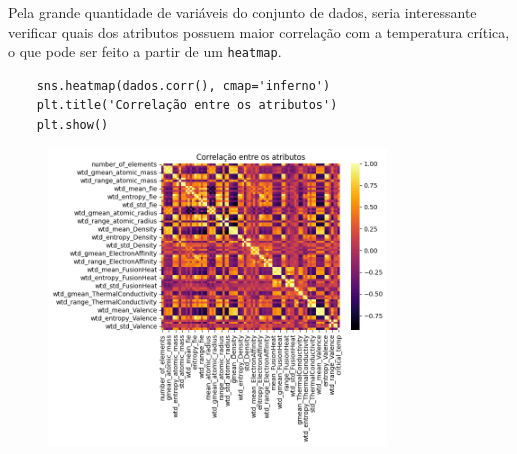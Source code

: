 Pela grande quantidade de variáveis do conjunto de dados, seria interessante verificar quais dos atributos possuem maior correlação com a temperatura crítica, o que pode ser feito a partir de um \verb|heatmap|.
\begin{longlisting}
    \begin{verbatim}
    sns.heatmap(dados.corr(), cmap='inferno')
    plt.title('Correlação entre os atributos')
    plt.show()
    \end{verbatim}
\end{longlisting}
\begin{figure}[H]
    \centering
    \includegraphics[width=0.8\textwidth]{figures/heatmap.png}
\end{figure}

